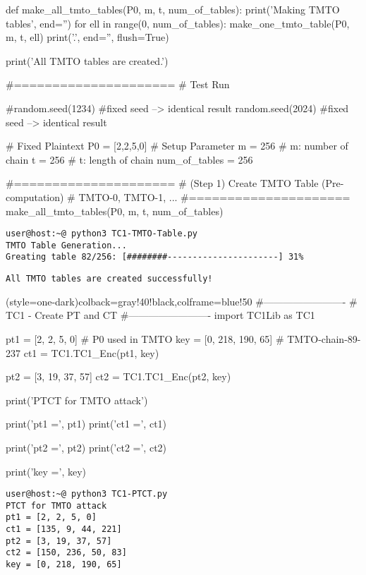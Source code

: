 \begin{python}
def make_all_tmto_tables(P0, m, t, num_of_tables):
   print('Making TMTO tables', end='')
   for ell in range(0, num_of_tables):
      make_one_tmto_table(P0, m, t, ell)
      print('.', end='', flush=True)

   print('\n All TMTO tables are created.')
   
#=====================
# Test Run

#random.seed(1234)  #fixed seed --> identical result
random.seed(2024)  #fixed seed --> identical result

# Fixed Plaintext
P0 = [2,2,5,0]
# Setup Parameter
m = 256             # m: number of chain
t = 256             # t: length of chain
num_of_tables = 256

#=====================
# (Step 1) Create TMTO Table (Pre-computation)
# TMTO-0, TMTO-1, ...
#=====================
make_all_tmto_tables(P0, m, t, num_of_tables)
\end{python}

\begin{lstlisting}[style=terminal]
user@host:~@ python3 TC1-TMTO-Table.py
TMTO Table Generation...
Greating table 82/256: [########----------------------] 31% 
\end{lstlisting}
\begin{lstlisting}[style=terminal]
All TMTO tables are created successfully!
\end{lstlisting}

\newpage
\begin{python}[TC1-PTCT.py](style=one-dark){colback=gray!40!black,colframe=blue!50}
#-------------------------
# TC1 - Create PT and CT
#-------------------------
import TC1Lib as TC1

pt1 = [2, 2, 5, 0]  # P0 used in TMTO
key = [0, 218, 190, 65]  # TMTO-chain-89-237
ct1 = TC1.TC1_Enc(pt1, key)

pt2 = [3, 19, 37, 57]
ct2 = TC1.TC1_Enc(pt2, key)

print('PTCT for TMTO attack')

print('pt1 =', pt1)
print('ct1 =', ct1)

print('pt2 =', pt2)
print('ct2 =', ct2)

print('key =', key)
\end{python}

\begin{lstlisting}[style=terminal]
user@host:~@ python3 TC1-PTCT.py      
PTCT for TMTO attack
pt1 = [2, 2, 5, 0]
ct1 = [135, 9, 44, 221]
pt2 = [3, 19, 37, 57]
ct2 = [150, 236, 50, 83]
key = [0, 218, 190, 65]
\end{lstlisting}

